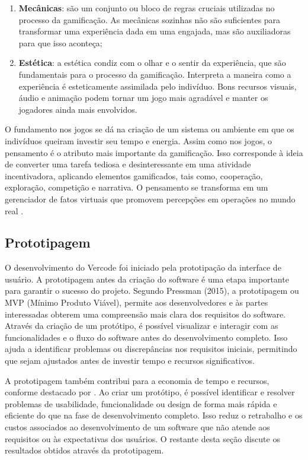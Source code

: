 \documentclass[12pt]{article}
\begin{document}
\begin{enumerate}
    \item \textbf{Mecânicas}: são um conjunto ou bloco de regras cruciais utilizadas no processo da gamificação. As mecânicas sozinhas não são suficientes para transformar uma experiência dada em uma engajada, mas são auxiliadoras para que isso aconteça;
    \item \textbf{Estética}: a estética condiz com o olhar e o sentir da experiência, que são fundamentais para o processo da gamificação. Interpreta a maneira como a experiência é esteticamente assimilada pelo indivíduo. Bons recursos visuais, áudio e animação podem tornar um jogo mais agradável e manter os jogadores ainda mais envolvidos.
\end{enumerate}

O fundamento nos jogos se dá na criação de um sistema ou ambiente em que os indivíduos queiram investir seu tempo e energia. Assim como nos jogos, o pensamento é o atributo mais importante da gamificação. Isso corresponde à ideia de converter uma tarefa tediosa e desinteressante em uma atividade incentivadora, aplicando elementos gamificados, tais como, cooperação, exploração, competição e narrativa. O pensamento se transforma em um gerenciador de fatos virtuais que promovem percepções em operações no mundo real \cite{kapp2012gamification}. 

\subsection{Prototipagem} \label{sec:prototipagem}

O desenvolvimento do Vercode foi iniciado pela prototipação da interface de usuário. A prototipagem antes da criação do software é uma etapa importante para garantir o sucesso do projeto. Segundo Pressman (2015), a prototipagem ou MVP (Mínimo Produto Viável), permite aos desenvolvedores e às partes interessadas obterem uma compreensão mais clara dos requisitos do software. Através da criação de um protótipo, é possível visualizar e interagir com as funcionalidades e o fluxo do software antes do desenvolvimento completo. Isso ajuda a identificar problemas ou discrepâncias nos requisitos iniciais, permitindo que sejam ajustados antes de investir tempo e recursos significativos.
	
A prototipagem também contribui para a economia de tempo e recursos, conforme destacado por \cite{somerville2003engenharia}. Ao criar um protótipo, é possível identificar e resolver problemas de usabilidade, funcionalidade ou design de forma mais rápida e eficiente do que na fase de desenvolvimento completo. Isso reduz o retrabalho e os custos associados ao desenvolvimento de um software que não atende aos requisitos ou às expectativas dos usuários. O restante desta seção discute os resultados obtidos através da prototipagem.
\end{document}
